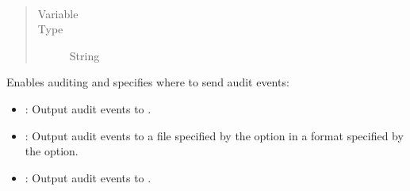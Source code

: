 \documentclass[letterpaper,10pt,english]{sphinxmanual}
\begin{document}
\begin{fulllineitems}
\label{\detokenize{audit-logging:cmdoption-auditDestination}}~\begin{quote}\begin{description}
\item[{Variable}] \leavevmode
\sphinxAtStartPar
{}

\item[{Type}] \leavevmode
\sphinxAtStartPar
String

\end{description}\end{quote}

\sphinxAtStartPar
Enables auditing and specifies where to send audit events:
\begin{itemize}
\item {} 
\sphinxAtStartPar
{}: Output audit events to .

\item {} 
\sphinxAtStartPar
{}: Output audit events to a file
specified by the {\hyperref[\detokenize{audit-logging:cmdoption-auditPath}]{}} option
in a format specified by the {\hyperref[\detokenize{audit-logging:cmdoption-auditFormat}]{}} option.

\item {} 
\sphinxAtStartPar
{}: Output audit events to .

\end{itemize}

\end{fulllineitems}

\end{document}

